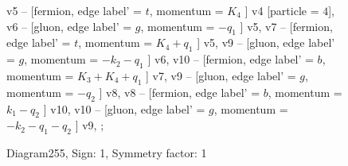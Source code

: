 \documentclass{revtex4}
\begin{document}
\begin{figure}[!htb]
\begin{center}
{v5 -- [fermion, edge label' = \(t\), momentum = \(K_{4}\) ] v4 [particle = \(4\)], 
v6 -- [gluon, edge label' = \(g\), momentum = \(-q_{1}\) ] v5, 
v7 -- [fermion, edge label' = \(t\), momentum = \(K_{4} + q_{1}\) ] v5, 
v9 -- [gluon, edge label' = \(g\), momentum = \(-k_{2} - q_{1}\) ] v6, 
v10 -- [fermion, edge label' = \(b\), momentum = \(K_{3} + K_{4} + q_{1}\) ] v7, 
v9 -- [gluon, edge label' = \(g\), momentum = \(-q_{2}\) ] v8, 
v8 -- [fermion, edge label' = \(b\), momentum = \(k_{1} - q_{2}\) ] v10, 
v10 -- [gluon, edge label' = \(g\), momentum = \(-k_{2} - q_{1} - q_{2}\) ] v9, 
};
\end{center}
\caption{Diagram255, Sign: 1, Symmetry factor: 1}
\end{figure}
\newpage
\end{document}
